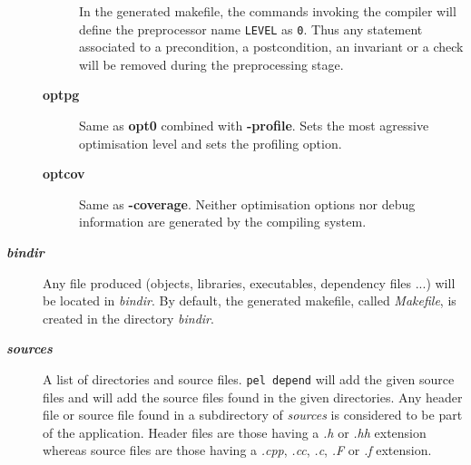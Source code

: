 \documentclass{article}
\begin{document}
\begin{description}
\begin{description}
In the generated makefile, the commands invoking the compiler
will define the preprocessor name \texttt{LEVEL} as \texttt{0}. Thus
any statement associated to a precondition, a postcondition, an
invariant or a check will be removed during the
preprocessing stage.


\item[\textbf{optpg}] \mbox{}

Same as \textbf{opt0} combined with \textbf{-profile}. Sets the most agressive optimisation level and sets the profiling option.


\item[\textbf{optcov}] \mbox{}

Same as \textbf{-coverage}. Neither optimisation options nor debug information are generated by the compiling system.

\end{description}

\item[\textbf{ \emph{bindir} }] \mbox{}

Any file produced (objects, libraries, executables, dependency files ...)
will be located in \emph{bindir}. By default, the generated makefile,
called \emph{Makefile}, is created in the directory \emph{bindir}.


\item[\textbf{ \emph{sources} }] \mbox{}

A list of directories and source files.
\texttt{pel depend} will add the given source files and will add the source files found in the given directories.
Any header file or source file found in
a subdirectory of \emph{sources} is considered to be part of the application.
Header files are those having a \emph{.h} or \emph{.hh} extension whereas source
files are those having a \emph{.cpp}, \emph{.cc}, \emph{.c}, \emph{.F} or \emph{.f} extension.

\end{description}
\end{document}
